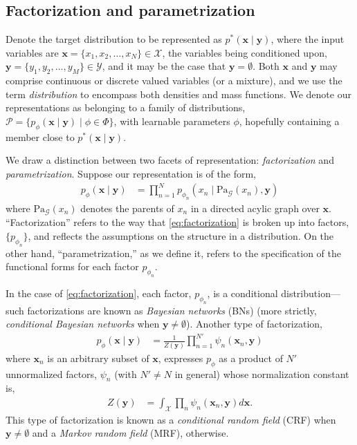 
\subsection{Factorization and parametrization}
Denote the target distribution to be represented as $p^*(\mathbf{x}\mid\mathbf{y})$, where the input variables are $\mathbf{x}=\{x_1,x_2,\ldots,x_N\}\in\mathcal{X}$, the variables being conditioned upon, $\mathbf{y}=\{y_1,y_2,\ldots,y_M\}\in\mathcal{Y}$, and it may be the case that $\mathbf{y}=\emptyset$. Both $\mathbf{x}$ and $\mathbf{y}$ may comprise continuous or discrete valued variables (or a mixture), and we use the term \emph{distribution} to encompass both densities and mass functions. We denote our representations as belonging to a family of distributions, $\mathcal{P}=\{p_\phi(\mathbf{x}\mid\mathbf{y})\mid\phi\in\Phi\}$, with learnable parameters $\phi$, hopefully containing a member close to $p^*(\mathbf{x}\mid\mathbf{y})$.

We draw a distinction between two facets of representation: \emph{factorization} and \emph{parametrization}. Suppose our representation is of the form,
\begin{align}\label{eq:factorization}
	p_\phi(\mathbf{x}\mid\mathbf{y}) &= \prod_{n=1}^Np_{\phi_n}(x_n\mid\text{Pa}_\mathcal{G}(x_n),\mathbf{y})
\end{align}
where $\text{Pa}_\mathcal{G}(x_n)$ denotes the parents of $x_n$ in a directed acylic graph over $\mathbf{x}$. ``Factorization'' refers to the way that \eqref{eq:factorization} is broken up into factors, $\{p_{\phi_n}\}$, and reflects the assumptions on the structure in a distribution. On the other hand, ``parametrization,'' as we define it, refers to the specification of the functional forms for each factor $p_{\phi_n}$.

In the case of \eqref{eq:factorization}, each factor, $p_{\phi_n}$, is a conditional distribution---such factorizations are known as \emph{Bayesian networks} (BNs) (more strictly, \emph{conditional Bayesian networks} when $\mathbf{y}\neq\emptyset$). Another type of factorization,
\begin{align}\label{eq:conditional-mf}
	p_\phi(\mathbf{x}\mid\mathbf{y}) &= \frac{1}{Z(\mathbf{y})}\prod_{n=1}^{N'}\psi_n(\mathbf{x}_n,\mathbf{y})
\end{align}
where $\mathbf{x}_n$ is an arbitrary subset of $\mathbf{x}$, expresses $p_\phi$ as a product of $N'$ unnormalized factors, $\psi_n$ (with $N'\neq N$ in general) whose normalization constant is,
\begin{align}
	Z(\mathbf{y}) &= \int_\mathcal{X}\prod_n\psi_n(\mathbf{x}_n,\mathbf{y})d\mathbf{x}.
\end{align}
This type of factorization is known as a \emph{conditional random field} (CRF) when $\mathbf{y}\neq\emptyset$ and a \emph{Markov random field} (MRF), otherwise.

